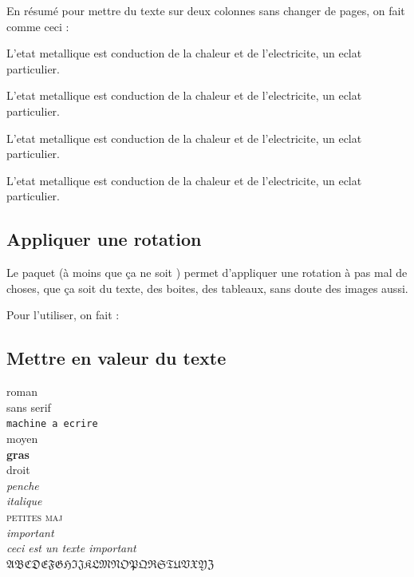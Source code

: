 \documentclass[a4paper,twoside]{article}
\begin{document}
En résumé pour mettre du texte sur deux colonnes sans changer de pages, on fait comme ceci :

\begin{example}
L'etat metallique est
conduction de la chaleur
 et de l'electricite,
un eclat particulier.
\begin{multicols}{2}
L'etat metallique est
conduction de la chaleur
 et de l'electricite,
un eclat particulier.

L'etat metallique est
conduction de la chaleur
 et de l'electricite,
un eclat particulier.
\end{multicols}
L'etat metallique est
conduction de la chaleur
 et de l'electricite,
un eclat particulier.
\end{example}



\subsection{Appliquer une rotation}
Le paquet  (à moins que ça ne soit ) permet d'appliquer une rotation à pas mal de choses, que ça soit du texte, des boites, des tableaux, sans doute des images aussi.

Pour l'utiliser, on fait :

\begin{example}
\end{example}

\subsection{Mettre en valeur du texte}
\begin{example}
\textrm{roman}\\
\textsf{sans serif}\\
\texttt{machine a ecrire}\\
\textmd{moyen}\\
\textbf{gras}\\
\textup{droit}\\
\textsl{penche}\\
\textit{italique}\\
\textsc{petites maj}\\
\emph{important}\\
\textit{ceci est un texte
\emph{important}}\\
$\mathfrak{ABCDEFGHIJKLMN
OPQRSTUVXYZ}$
\end{example}
\end{document}
